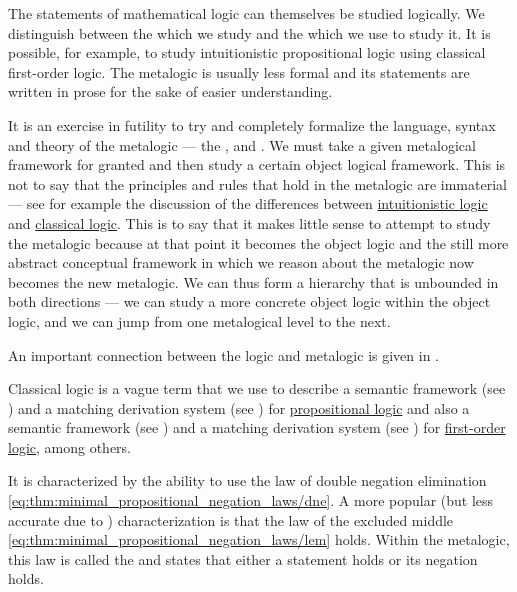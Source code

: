 \begin{remark}\label{rem:metalogic}
  The statements of mathematical logic can themselves be studied logically. We distinguish between the  which we study and the  which we use to study it. It is possible, for example, to study intuitionistic propositional logic using classical first-order logic. The metalogic is usually less formal and its statements are written in prose for the sake of easier understanding.

  It is an exercise in futility to try and completely formalize the language, syntax and theory of the metalogic --- the ,  and . We must take a given metalogical framework for granted and then study a certain object logical framework. This is not to say that the principles and rules that hold in the metalogic are immaterial --- see for example the discussion of the differences between \hyperref[def:intuitionistic_logic]{intuitionistic logic} and \hyperref[def:classical_logic]{classical logic}. This is to say that it makes little sense to attempt to study the metalogic because at that point it becomes the object logic and the still more abstract conceptual framework in which we reason about the metalogic now becomes the new metalogic. We can thus form a hierarchy that is unbounded in both directions --- we can study a more concrete object logic within the object logic, and we can jump from one metalogical level to the next.

  An important connection between the logic and metalogic is given in .
\end{remark}

\begin{definition}\label{def:classical_logic}
  Classical logic is a vague term that we use to describe a semantic framework (see ) and a matching derivation system (see ) for \hyperref[subsec:propositional_logic]{propositional logic} and also a semantic framework (see ) and a matching derivation system (see ) for \hyperref[subsec:first_order_logic]{first-order logic}, among others.

  It is characterized by the ability to use the law of double negation elimination \eqref{eq:thm:minimal_propositional_negation_laws/dne}. A more popular (but less accurate due to ) characterization is that the law of the excluded middle \eqref{eq:thm:minimal_propositional_negation_laws/lem} holds. Within the metalogic, this law is called the  and states that either a statement holds or its negation holds.
\end{definition}

